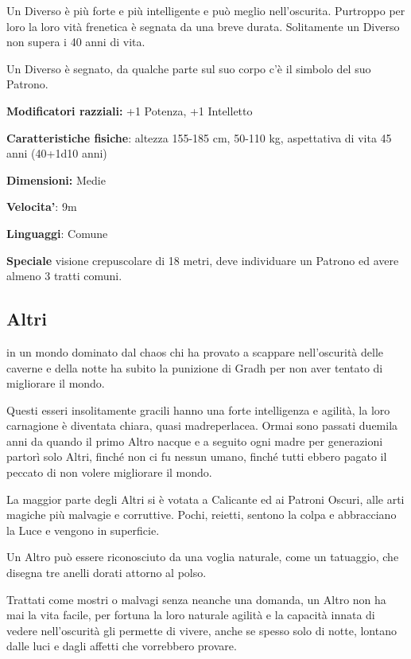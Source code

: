 \documentclass[a4paper,11pt,twoside,openany]{book}
\begin{document}
Un Diverso è più forte e più intelligente e può meglio nell'oscurita. Purtroppo per loro la loro vità frenetica è segnata da una breve durata. Solitamente un Diverso non supera i 40 anni di vita.

Un Diverso è segnato, da qualche parte sul suo corpo c'è il simbolo del suo Patrono.

\textbf{Modificatori razziali:} +1 Potenza, +1 Intelletto

\textbf{Caratteristiche fisiche}: altezza 155-185 cm, 50-110 kg, aspettativa di vita 45 anni (40+1d10 anni)

\textbf{Dimensioni:} Medie

\textbf{Velocita'}: 9m

\textbf{Linguaggi}: Comune

\textbf{Speciale} visione crepuscolare di 18 metri, deve individuare un Patrono ed avere almeno 3 tratti comuni.

\subsection{Altri}

\label{altri}

in un mondo dominato dal chaos chi ha provato a scappare nell'oscurità delle caverne e della notte ha subito la punizione di Gradh per non aver tentato di migliorare il mondo.

Questi esseri insolitamente gracili hanno una forte intelligenza e agilità, la loro carnagione è diventata chiara, quasi madreperlacea. Ormai sono passati duemila anni da quando il primo Altro nacque e a seguito ogni madre per generazioni partorì solo Altri, finché non ci fu nessun umano, finché tutti ebbero pagato il peccato di non volere migliorare il mondo.

La maggior parte degli Altri si è votata a Calicante ed ai Patroni Oscuri, alle arti magiche più malvagie e corruttive. Pochi, reietti, sentono la colpa e abbracciano la Luce e vengono in superficie.

Un Altro può essere riconosciuto da una voglia naturale, come un tatuaggio, che disegna tre anelli dorati attorno al polso.

Trattati come mostri o malvagi senza neanche una domanda, un Altro non ha mai la vita facile, per fortuna la loro naturale agilità e la capacità innata di vedere nell'oscurità gli permette di vivere, anche se spesso solo di notte, lontano dalle luci e dagli affetti che vorrebbero provare.
\end{document}
